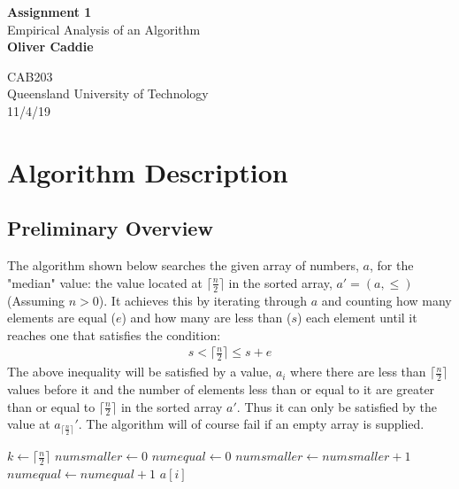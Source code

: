 \documentclass{article}
\begin{document}


\begin{titlepage}
\vspace{2cm}
\begin{center}
\textbf{Assignment 1}\\
\vspace{0.5cm}
Empirical Analysis of an Algorithm\\
\vspace{1.5cm}
\textbf{Oliver Caddie}\\
\vfill

CAB203\\
Queensland University of Technology\\
11/4/19
 
\end{center}
\end{titlepage}





\tableofcontents


\pagebreak


\section{Algorithm Description}
\subsection{Preliminary Overview}
The algorithm shown below searches the given array of numbers, $a$, for the "median" value: the value located at $\lceil \frac{n}{2} \rceil$ in the sorted array, $a'=(a,\leq)$ (Assuming $n > 0$). It achieves this by iterating through $a$ and counting how many elements are equal ($e$) and how many are less than ($s$) each element until it reaches one that satisfies the condition:
\begin{align*}
s < \Big\lceil \frac{n}{2} \Big\rceil \leq s + e
\end{align*}
The above inequality will be satisfied by a value, $a_i$ where there are less than $\lceil \frac{n}{2} \rceil$ values before it and the number of elements less than or equal to it are greater than or equal to $\lceil \frac{n}{2} \rceil$ in the sorted array $a'$. Thus it can only be satisfied by the value at $a_{\lceil \frac{n}{2} \rceil}'$. The algorithm will of course fail if an empty array is supplied.

\noindent \hrulefill
\begin{algorithmic}[1]
\State $k \gets \lceil\frac{n}{2}\rceil$
\State $numsmaller \gets 0$
\State $numequal \gets 0$
    \State $numsmaller \gets numsmaller + 1$
\Else
        \State $numequal \gets numequal + 1$
    \EndIf
\EndIf
\EndFor
{}
\State \Return $a[i]$
\EndIf
\EndFor
\EndFunction
\end{algorithmic}
\hrulefill
\end{document}
